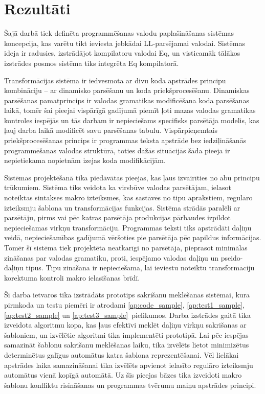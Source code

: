 \section*{Rezultāti}
\label{s:results}

Šajā darbā tiek definēta programmēšanas valodu paplašināšanas sistēmas koncepcija, kas varētu tikt ieviesta jebkādai LL-parsējamai valodai. Sistēmas ideja ir radusies, izstrādājot kompilatoru valodai Eq, un visticamāk tālākos izstrādes posmos sistēma tiks integrēta Eq kompilatorā.

Transformācijas sistēma ir iedvesmota ar divu koda apstrādes principu kombināciju -- ar dinamisko parsēšanu un koda priekšprocesēšanu. Dinamiskas parsēšanas pamatprincips ir valodas gramatikas modificēšana koda parsēšanas laikā, tomēr šai pieejai vispārīgā gadījumā piemīt ļoti mazas valodas gramatikas kontroles iespējās un tās darbam ir nepieciešams specifisks parsētāja modelis, kas ļauj darba laikā modificēt savu parsēšanas tabulu. Vispārpieņemtais priekšprocesēšanas princips ir programmas teksta apstrāde bez iedziļināšanās programmēšanas valodas struktūrā, toties dažās situācijās šāda pieeja ir nepietiekama nopietnām izejas koda modifikācijām.

Sistēmas projektēšanā tika piedāvātas pieejas, kas ļaus izvairīties no abu principu trūkumiem. Sistēma tiks veidota ka virsbūve valodas parsētājam, ielasot noteiktas sintakses makro izteiksmes, kas sastāvēs no tipu aprakstiem, regulāro izteiksmju šablona un transformācijas funkcijas. Sistēma strādās paralēli ar parsētāju, pirms vai pēc katras parsētāja produkcijas pārbaudes izpildot nepieciešamas virkņu transformāciju. Programmas teksti tiks apstrādāti daļiņu veidā, nepieciešamības gadījumā vēršoties pie parsētāja pēc papildus informācijas. Tomēr šī sistēma tiek projektēta neatkarīgi no parsētāja, pieprasot minimālas zināšanas par valodas gramatiku, proti, iespējamo valodas daļiņu un pseido-daļiņu tipus. Tipu zināšana ir nepieciešama, lai ieviestu noteiktu transformāciju korektuma kontroli makro ielasīšanas brīdī.

Šī darba ietvaros tika izstrādāts prototips sakrišanu meklēšanas sistēmai, kura pirmkoda un testu piemēri ir atrodami \ref{ap:code_sample}, \ref{ap:test1_sample}, \ref{ap:test2_sample} un \ref{ap:test3_sample}~pielikumos. Darba izstrādes gaitā tika izveidota algoritmu kopa, kas ļaus efektīvi meklēt daļiņu virkņu sakrišanas ar šabloniem, un izvēlētie algoritmi tika implementēti prototipā. Lai pēc iespējas samazināt šablonu sakrišanu meklēšanas laiku, tika izvēlēts lietot minimizētus determinētus galīgus automātus katra šablona reprezentēšanai. Vēl lielākai apstrādes laika samazināšanai tika izvēlēts apvienot ielasīto regulāro izteiksmju automātus vienā kopīgā automātā. Uz šīs pieejas bāzes tika izveidoti makro šablonu konfliktu risināšanas un programmas tvērumu maiņu apstrādes principi.

